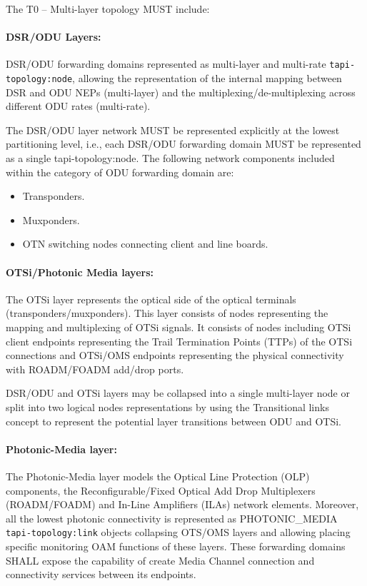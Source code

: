 \documentclass[a4paper,fleqn]{cas-dc}
\begin{document}
The T0 – Multi-layer topology MUST include:

\paragraph{DSR/ODU Layers:}
DSR/ODU forwarding domains represented as multi-layer and multi-rate \texttt{tapi-topology:node}, allowing the representation of the internal mapping between DSR and ODU NEPs (multi-layer) and the multiplexing/de-multiplexing across different ODU rates (multi-rate). 

The DSR/ODU layer network MUST be represented explicitly at the lowest partitioning level, i.e., each DSR/ODU forwarding domain MUST be represented as a single tapi-topology:node. The following network components included within the category of ODU forwarding domain are:

\begin{itemize}
    \item Transponders.
    \item Muxponders.
    \item OTN switching nodes connecting client and line boards.
\end{itemize}

\paragraph{OTSi/Photonic Media layers:}
The OTSi layer represents the optical side of the optical terminals (transponders/muxponders). This layer consists of nodes representing the mapping and multiplexing of OTSi signals. It consists of nodes including OTSi client endpoints representing the Trail Termination Points (TTPs) of the OTSi connections and OTSi/OMS endpoints representing the physical connectivity with ROADM/FOADM add/drop ports.

DSR/ODU and OTSi layers may be collapsed into a single multi-layer node or split into two logical nodes representations by using the Transitional links concept to represent the potential layer transitions between ODU and OTSi.

\paragraph{Photonic-Media layer:}
The Photonic-Media layer models the Optical Line Protection  (OLP) components, the Reconfigurable/Fixed Optical Add Drop Multiplexers (ROADM/FOADM) and In-Line Amplifiers (ILAs) network elements. Moreover, all the lowest photonic connectivity is represented as PHOTONIC\_MEDIA \texttt{tapi-topology:link} objects collapsing OTS/OMS layers and allowing placing specific monitoring OAM functions of these layers. These forwarding domains SHALL expose the capability of create Media Channel connection and connectivity services between its endpoints.
\end{document}
